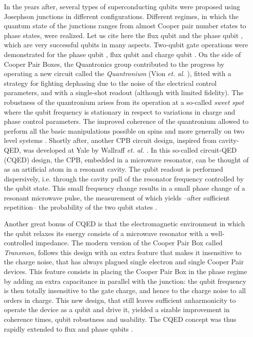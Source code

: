 In the years after, several types of superconducting qubits were proposed
using Josephson junctions in different configurations. Different regimes,
in which the quantum state of the junctions ranges from almost Cooper
pair number states to phase states, were realized. Let us cite here
the flux qubit \citep{mooij_josephson_1999, chiorescu_coherent_2003}
and the phase qubit \citep{martinis_rabi_2002}, which are very
successful qubits in many aspects. Two-qubit gate operations were demonstrated for the phase qubit \citep{bialczak_quantum_2010}, flux qubit \citep{plantenberg_demonstration_2007} and charge qubit \citep{yamamoto_demonstration_2003}. On the side of Cooper Pair Boxes, the Quantronics group contributed to the progress by operating a new circuit called the \textit{Quantronium} (Vion {\it et. al.} \citep{vion_manipulating_2002}),
fitted with a strategy for fighting dephasing due to the noise of
the electrical control parameters, and with a single-shot
readout (although with limited fidelity). The robustness of the quantronium
arises from its operation at a so-called {\it sweet spot} where the qubit
frequency is stationary in respect to variations in charge and phase control parameters. The improved coherence of
the quantronium allowed to perform all the basic manipulations possible
on spins and more generally on two level systems \citep{collin_nmr-like_2004}. Shortly after, another CPB circuit design, inspired from
cavity-QED, was developed at Yale by Wallraff {\it et. al.} \citep{wallraff_strong_2004}.
In this so-called circuit-QED (CQED) design, the
CPB, embedded in a microwave resonator, can be thought of as an artificial
atom in a resonant cavity. The qubit readout is performed
dispersively, i.e. through the cavity pull of the resonator frequency
controlled by the qubit state. This small frequency change results
in a small phase change of a resonant microwave pulse, the measurement of which yields
--after sufficient repetition-- the probability of the two qubit states
\citep{blais_cavity_2004}.

\smallskip{}


Another great bonus of CQED is that the electromagnetic
environment in which the qubit relaxes its energy consists of a microwave
resonator with a well-controlled impedance. The modern
version of the Cooper Pair Box called \textit{Transmon}, follows this
design with an extra feature that makes it insensitive to the charge
noise, that has always plagued single electron and single Cooper Pair devices.
This feature consists in placing the Cooper Pair
Box in the phase regime by adding an extra capacitance in
parallel with the junction: the qubit frequency is then
totally insensitive to the gate charge, and hence to the charge noise to all orders in charge.
This new design, that still leaves sufficient anharmonicity
to operate the device as a qubit and drive it, yielded a
sizable improvement in coherence times, qubit robustness and usability.
The CQED concept was thus rapidly extended to flux and phase qubits \citep{hofheinz_synthesizing_2009}.

